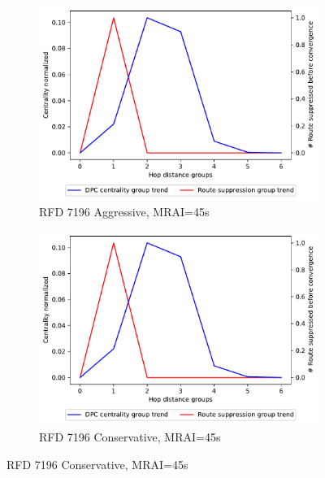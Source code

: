 \begin{figure}[H]
\begin{subfigure}[b]{0.325\textwidth}
     \end{subfigure}
     \hfill
     \begin{subfigure}[b]{0.325\textwidth}
         \centering
         \includegraphics[width=\textwidth]{images/RFD/miceVSelephants/MultiMRAI/45/elephants/cisco_1000_RFD_7196_aggressive_nodeConvergence_centVSsup_trend.pdf}
         \caption{\scriptsize RFD 7196 Aggressive, MRAI=45s}
         \label{fig:1000_7196RFDA_centVSsup_elephants_MRAI45}
     \end{subfigure}
     \hfill
     \begin{subfigure}[b]{0.325\textwidth}
         \centering
         \includegraphics[width=\textwidth]{images/RFD/miceVSelephants/MultiMRAI/45/elephants/cisco_1000_RFD_7196_conservative_nodeConvergence_centVSsup_trend.pdf}
         \caption{\scriptsize RFD 7196 Conservative, MRAI=45s}
         \label{fig:1000_7196RFDC_centVSsup_elephants_MRAI45}

\end{subfigure}
\end{figure}
